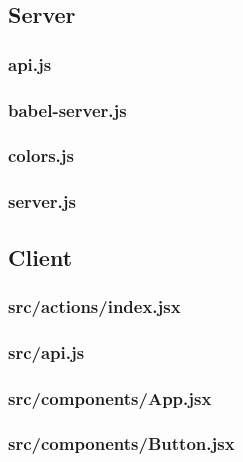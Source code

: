 \subsection{Server}
\label{app:web_server}
\subsubsection{api.js}
\label{app:server_api_js}

\subsubsection{babel-server.js}
\label{app:server_babel_server_js}

\subsubsection{colors.js}
\label{app:server_colors_js}

\subsubsection{server.js}
\label{app:server_server_js}

\subsection{Client}
\label{app:web_client}
\subsubsection{src/actions/index.jsx}
\label{app:client_src_actions_index_jsx}

\subsubsection{src/api.js}
\label{app:client_src_api_js}

\subsubsection{src/components/App.jsx}
\label{app:client_src_components_App_jsx}

\subsubsection{src/components/Button.jsx}
\label{app:client_src_components_Button_jsx}

